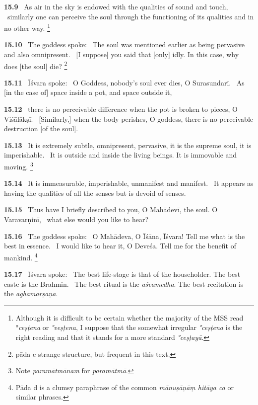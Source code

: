 \documentclass{article}
\newcommand{\skt}[1]{\textit{#1}}
\begin{document}
\textbf{15.9}%
\ As air in the sky is endowed with the qualities of sound and touch,%
\                  similarly one can perceive the soul through the functioning of its qualities and in no other way.%
\footnote{Although it is difficult to be certain whether the majority of the MSS read °\skt{ceṣṭena} or \skt{°veṣṭena},                        I suppose that the somewhat irregular \skt{°ceṣṭena} is the right reading                         and that it stands for a more standard \skt{°ceṣṭayā}. }%


\textbf{15.10}%
\ The goddess spoke:%
\ The soul was mentioned earlier as being pervasive and also omnipresent.%
\                  [I suppose] you said that [only] idly. In this case, why does [the soul] die?%
\footnote{pāda c strange structure, but frequent in this text. }%


\textbf{15.11}%
\ Īśvara spoke:%
\ O Goddess, nobody's soul ever dies, O Surasundarī.%
\                  As [in the case of] space inside a pot, and space outside it,%


\textbf{15.12}%
\ there is no perceivable difference when the pot is broken to pieces, O Viśālākṣī.%
\                   [Similarly,] when the body perishes, O goddess, there is no perceivable destruction [of the soul].%


\textbf{15.13}%
\ It is extremely subtle, omnipresent, pervasive, it is the supreme soul, it is imperishable.%
\              It is outside and inside the living beings. It is immovable and moving.%
\footnote{Note \skt{paramātmānam} for \skt{paramātmā}. }%


\textbf{15.14}%
\ It is immeasurable, imperishable, unmanifest and manifest.%
\                  It appears as having the qualities of all the senses but is devoid of senses.%


\textbf{15.15}%
\ Thus have I briefly described to you, O Mahādevī, the soul. O Varavarṇinī,%
\                 what else would you like to hear?%


\textbf{15.16}%
\ The goddess spoke:%
\ O Mahādeva, O Īśāna, Īśvara! Tell me what is the best in essence.%
\                 I would like to hear it, O Deveśa. Tell me for the benefit of mankind.%
\footnote{Pāda d is a clumsy paraphrase of the common \skt{mānuṣāṇāṃ hitāya ca} or similar phrases. }%


\textbf{15.17}%
\ Īśvara spoke:%
\ The best life-stage is that of the householder. The best caste is the Brahmin.%
\                   The best ritual is the \skt{aśvamedha}. The best recitation is the \skt{aghamarṣaṇa}.%
\end{document}

